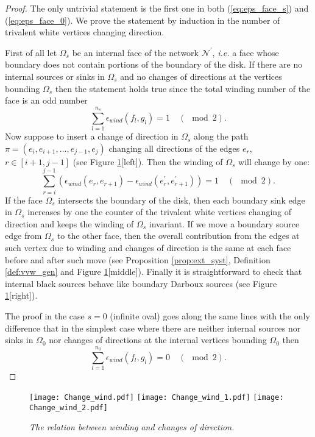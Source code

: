 \documentclass[11pt]{amsart}
\theoremstyle{plain}
\numberwithin{equation}{section}
\begin{document}
\begin{proof}
The only untrivial statement is the first one in both (\ref{eq:eps_face_s}) and (\ref{eq:eps_face_0}). We prove the statement by induction in the number of trivalent white vertices changing direction. 

First of all let $\Omega_s$ be an internal face of the network ${\mathcal N}^{\prime}$, {\sl i.e.} a face whose boundary does not contain portions of the boundary of the disk. If there are no internal sources or sinks in $\Omega_s$ and no changes of directions at the vertices bounding $\Omega_s$ then the statement holds true since the total winding number of the face is an odd number
\[
\sum_{l=1}^{n_s} \epsilon_{wind} (f_l,g_l) = 1 \quad
(\!\!\!\!\!\!\mod 2).
\]
Now suppose to insert a change of direction in $\Omega_s$ along the path $\pi= (e_{i},e_{i+1},\dots,e_{j-1},e_j)$ changing all directions of the edges $e_r$, $r\in [i+1,j-1]$ (see Figure \ref{fig:wind_change}[left]). Then the winding of $\Omega_s$ will change by one:
\[
\sum_{r=i}^{j-1} \left(\epsilon_{wind} (e_r, e_{r+1}) -\epsilon_{wind} (e_r^{\prime}, e_{r+1}^{\prime})\right) =1 \quad
(\!\!\!\!\!\!\mod 2).
\]
If the face $\Omega_s$ intersects the boundary of the disk, then each boundary sink edge in $\Omega_s$ increases by one the counter of the trivalent white vertices changing of direction and keeps the winding of $\Omega_s$ invariant. If we move a boundary source edge from $\Omega_s$ to
the other face, then the overall contribution  from the edges at such vertex due to winding and changes of direction is the same at each face
before and after such move (see Proposition \ref{prop:ext_syst}, Definition \ref{def:vvw_gen} and Figure \ref{fig:wind_change}[middle]). Finally it is straightforward to check that internal black sources behave 
like boundary Darboux sources (see Figure \ref{fig:wind_change}[right]).

The proof in the case $s=0$ (infinite oval) goes along the same lines with the only difference that in the simplest case where there are neither internal sources nor sinks in $\Omega_0$ nor changes of directions at the internal vertices bounding $\Omega_0$ then 
\[
\sum_{l=1}^{n_0} \epsilon_{wind} (f_l,g_l) = 0\quad
(\!\!\!\!\!\!\mod 2).
\]
\end{proof}

\begin{figure}%
  \centering
  \texttt{[image: Change\_wind.pdf]}
\hfill
  \texttt{[image: Change\_wind\_1.pdf]}
\hfill
  \texttt{[image: Change\_wind\_2.pdf]}
  \vspace{-0.7 truecm}
  \caption{\small{\sl The relation between winding and changes of direction.}}
	\label{fig:wind_change}
\end{figure}
\end{document}
